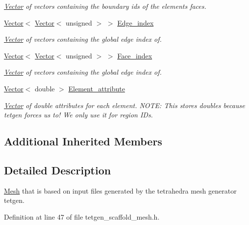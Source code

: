 \begin{DoxyCompactItemize}
\begin{DoxyCompactList}\small\item\em \hyperlink{classoomph_1_1Vector}{Vector} of vectors containing the boundary ids of the elements\textquotesingle{} faces. \end{DoxyCompactList}\item 
\hyperlink{classoomph_1_1Vector}{Vector}$<$ \hyperlink{classoomph_1_1Vector}{Vector}$<$ unsigned $>$ $>$ \hyperlink{classoomph_1_1TetgenScaffoldMesh_abfe6528465bcfd20119a23a397f846b0}{Edge\+\_\+index}
\begin{DoxyCompactList}\small\item\em \hyperlink{classoomph_1_1Vector}{Vector} of vectors containing the global edge index of. \end{DoxyCompactList}\item 
\hyperlink{classoomph_1_1Vector}{Vector}$<$ \hyperlink{classoomph_1_1Vector}{Vector}$<$ unsigned $>$ $>$ \hyperlink{classoomph_1_1TetgenScaffoldMesh_a92a09461106996546e69d14ec5168278}{Face\+\_\+index}
\begin{DoxyCompactList}\small\item\em \hyperlink{classoomph_1_1Vector}{Vector} of vectors containing the global edge index of. \end{DoxyCompactList}\item 
\hyperlink{classoomph_1_1Vector}{Vector}$<$ double $>$ \hyperlink{classoomph_1_1TetgenScaffoldMesh_a47b01372fe4cf5c305169fdb57fc5e5a}{Element\+\_\+attribute}
\begin{DoxyCompactList}\small\item\em \hyperlink{classoomph_1_1Vector}{Vector} of double attributes for each element. N\+O\+TE\+: This stores doubles because tetgen forces us to! We only use it for region I\+Ds. \end{DoxyCompactList}\end{DoxyCompactItemize}
\subsection*{Additional Inherited Members}


\subsection{Detailed Description}
\hyperlink{classoomph_1_1Mesh}{Mesh} that is based on input files generated by the tetrahedra mesh generator tetgen. 

Definition at line 47 of file tetgen\+\_\+scaffold\+\_\+mesh.\+h.



